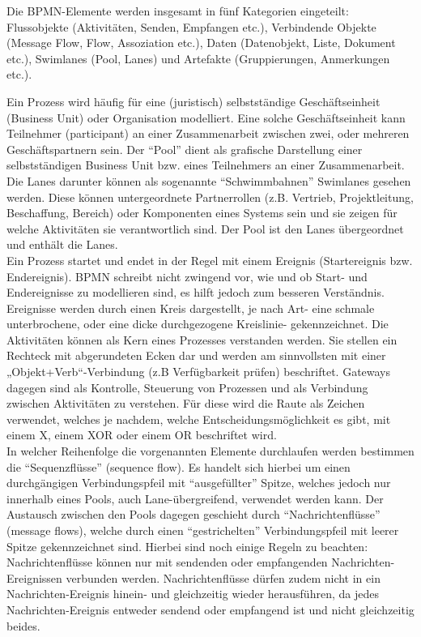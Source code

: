 Die BPMN-Elemente werden insgesamt in fünf Kategorien eingeteilt: Flussobjekte
(Aktivitäten, Senden, Empfangen etc.), Verbindende Objekte
(Message Flow, Flow, Assoziation etc.), Daten (Datenobjekt, Liste, Dokument etc.),
Swimlanes (Pool, Lanes) und Artefakte (Gruppierungen, Anmerkungen etc.).

Ein Prozess wird häufig für eine (juristisch) selbstständige  Geschäftseinheit
(Business Unit) oder Organisation modelliert. Eine solche Geschäftseinheit
kann Teilnehmer (participant) an einer Zusammenarbeit zwischen zwei,
oder mehreren Geschäftspartnern sein. Der "`Pool"'  dient als grafische
Darstellung einer selbstständigen Business Unit bzw. eines Teilnehmers
an einer Zusammenarbeit. Die Lanes darunter können als sogenannte "`Schwimmbahnen"'
Swimlanes gesehen werden. Diese können untergeordnete Partnerrollen
(z.B. Vertrieb, Projektleitung, Beschaffung, Bereich) oder Komponenten
eines Systems sein und sie zeigen für welche Aktivitäten sie verantwortlich sind.
Der Pool ist den Lanes übergeordnet und enthält die Lanes.\\

Ein Prozess startet und endet in der Regel mit einem Ereignis (Startereignis
bzw. Endereignis). BPMN schreibt nicht zwingend vor, wie und ob Start-
und Endereignisse zu modellieren sind, es hilft jedoch zum besseren Verständnis.
Ereignisse werden durch einen Kreis dargestellt, je nach Art- eine schmale
unterbrochene, oder eine dicke durchgezogene Kreislinie- gekennzeichnet.
Die Aktivitäten können als Kern eines Prozesses verstanden werden.
Sie stellen ein Rechteck mit abgerundeten Ecken dar und werden am
sinnvollsten mit einer „Objekt+Verb“-Verbindung (z.B Verfügbarkeit prüfen)
beschriftet. Gateways dagegen sind als Kontrolle, Steuerung von Prozessen
und als Verbindung zwischen Aktivitäten zu verstehen. Für diese wird die
Raute als Zeichen verwendet, welches je nachdem, welche Entscheidungsmöglichkeit
es gibt, mit einem X, einem XOR oder einem OR beschriftet wird.\\

In welcher Reihenfolge die vorgenannten Elemente durchlaufen werden bestimmen
die "`Sequenzflüsse"' (sequence flow). Es handelt sich hierbei um einen
durchgängigen Verbindungspfeil mit "`ausgefüllter"' Spitze, welches jedoch nur
innerhalb eines Pools, auch Lane-übergreifend, verwendet werden kann.
Der Austausch zwischen den Pools dagegen geschieht durch "`Nachrichtenflüsse"' (message flows),
 welche durch einen "`gestrichelten"' Verbindungspfeil mit leerer Spitze gekennzeichnet
 sind. Hierbei sind noch einige Regeln zu beachten: Nachrichtenflüsse können nur mit
 sendenden oder empfangenden Nachrichten-Ereignissen verbunden werden.
 Nachrichtenflüsse dürfen zudem nicht in ein Nachrichten-Ereignis hinein- und
 gleichzeitig wieder herausführen, da jedes Nachrichten-Ereignis entweder sendend
 oder empfangend ist und nicht gleichzeitig beides.\\


